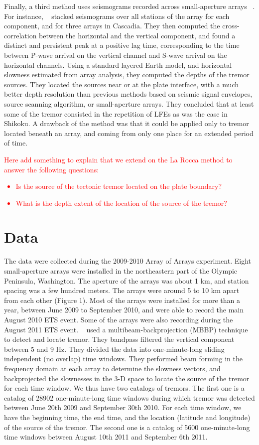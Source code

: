 \documentclass[draft]{agujournal2019}
\begin{document}
Finally, a third method uses seismograms recorded across small-aperture arrays ~\cite{GHO_2010_GRL, LAR_2009}. For instance, ~ stacked seismograms over all stations of the array for each component, and for three arrays in Cascadia. They then computed the cross-correlation between the horizontal and the vertical component, and found a distinct and persistent peak at a positive lag time, corresponding to the time between P-wave arrival on the vertical channel and S-wave arrival on the horizontal channels. Using a standard layered Earth model, and horizontal slowness estimated from array analysis, they computed the depths of the tremor sources. They located the sources near or at the plate interface, with a much better depth resolution than previous methods based on seismic signal envelopes, source scanning algorithm, or small-aperture arrays. They concluded that at least some of the tremor consisted in the repetition of LFEs as was the case in Shikoku. A drawback of the method was that it could be applied only to tremor located beneath an array, and coming from only one place for an extended period of time.

\textcolor{red}{Here add something to explain that we extend on the La Rocca method to answer the following questions:
\begin{itemize}
\item Is the source of the tectonic tremor located on the plate boundary?
\item What is the depth extent of the location of the source of the tremor?
\end{itemize}
}

\section{Data}

The data were collected during the 2009-2010 Array of Arrays experiment. Eight small-aperture arrays were installed in the northeastern part of the Olympic Peninsula, Washington. The aperture of the arrays was about 1 km, and station spacing was a few hundred meters. The arrays were around 5 to 10 km apart from each other (Figure 1). Most of the arrays were installed for more than a year, between June 2009 to September 2010, and were able to record the main August 2010 ETS event. Some of the arrays were also recording during the August 2011 ETS event. ~ used a multibeam-backprojection (MBBP) technique to detect and locate tremor. They bandpass filtered the vertical component between 5 and 9 Hz. They divided the data into one-minute-long sliding independent (no overlap) time windows. They performed beam forming in the frequency domain at each array to determine the slowness vectors, and backprojected the slownesses in the 3-D space to locate the source of the tremor for each time window. We thus have two catalogs of tremors. The first one is a catalog of 28902 one-minute-long time windows during which tremor was detected between June 20th 2009 and September 30th 2010. For each time window, we have the beginning time, the end time, and the location (latitude and longitude) of the source of the tremor. The second one is a catalog of 5600 one-minute-long time windows between August 10th 2011 and September 6th 2011.
\end{document}
